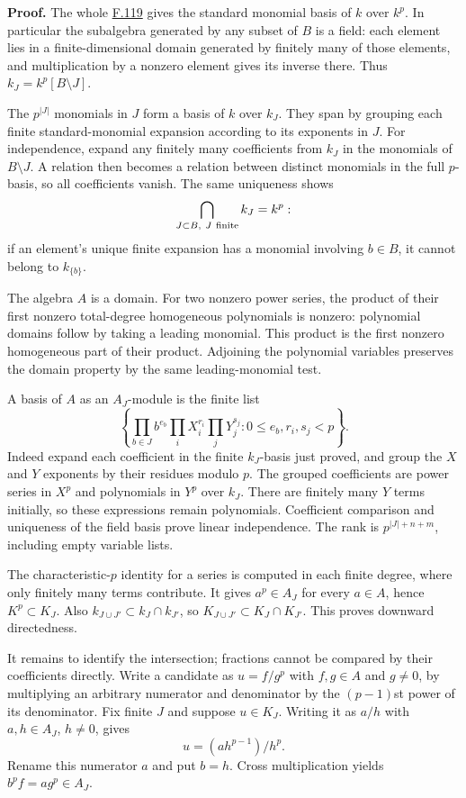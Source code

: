 \documentclass[11pt,a4paper,openany]{report}
\begin{document}
\textbf{Proof.} The whole \hyperref[AG-RG-S05-more-algebra-lemma-p-basis]{F.119} gives the standard monomial basis of \(k\) over \(k^p\). In particular the subalgebra generated by any subset of \(B\) is a field: each element lies in a finite-dimensional domain generated by finitely many of those elements, and multiplication by a nonzero element gives its inverse there. Thus \(k_J=k^p[B\setminus J]\).

The \(p^{|J|}\) monomials in \(J\) form a basis of \(k\) over \(k_J\). They span by grouping each finite standard-monomial expansion according to its exponents in \(J\). For independence, expand any finitely many coefficients from \(k_J\) in the monomials of \(B\setminus J\). A relation then becomes a relation between distinct monomials in the full \(p\)-basis, so all coefficients vanish. The same uniqueness shows \[\bigcap_{J\subset B,\ J\ {\rm finite}}k_J=k^p:\] if an element's unique finite expansion has a monomial involving \(b\in B\), it cannot belong to \(k_{\{b\}}\).

The algebra \(A\) is a domain. For two nonzero power series, the product of their first nonzero total-degree homogeneous polynomials is nonzero: polynomial domains follow by taking a leading monomial. This product is the first nonzero homogeneous part of their product. Adjoining the polynomial variables preserves the domain property by the same leading-monomial test.

A basis of \(A\) as an \(A_J\)-module is the finite list \[
\left\{\prod_{b\in J}b^{e_b}\prod_iX_i^{r_i}\prod_jY_j^{s_j}:
0\leq e_b,r_i,s_j<p\right\}.
\] Indeed expand each coefficient in the finite \(k_J\)-basis just proved, and group the \(X\) and \(Y\) exponents by their residues modulo \(p\). The grouped coefficients are power series in \(X^p\) and polynomials in \(Y^p\) over \(k_J\). There are finitely many \(Y\) terms initially, so these expressions remain polynomials. Coefficient comparison and uniqueness of the field basis prove linear independence. The rank is \(p^{|J|+n+m}\), including empty variable lists.

The characteristic-\(p\) identity for a series is computed in each finite degree, where only finitely many terms contribute. It gives \(a^p\in A_J\) for every \(a\in A\), hence \(K^p\subset K_J\). Also \(k_{J\cup J'}\subset k_J\cap k_{J'}\), so \(K_{J\cup J'}\subset K_J\cap K_{J'}\). This proves downward directedness.

It remains to identify the intersection; fractions cannot be compared by their coefficients directly. Write a candidate as \(u=f/g^p\) with \(f,g\in A\) and \(g\ne0\), by multiplying an arbitrary numerator and denominator by the \((p-1)\)st power of its denominator. Fix finite \(J\) and suppose \(u\in K_J\). Writing it as \(a/h\) with \(a,h\in A_J\), \(h\ne0\), gives \[u=(ah^{p-1})/h^p.\] Rename this numerator \(a\) and put \(b=h\). Cross multiplication yields \(b^pf=ag^p\in A_J\).
\end{document}
